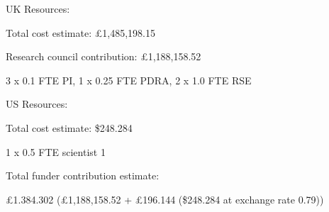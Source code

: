 
UK Resources:

Total cost estimate: £1,485,198.15

Research council contribution: £1,188,158.52

3 x 0.1 FTE PI, 1 x 0.25 FTE PDRA, 2 x 1.0 FTE RSE

\vspace{0.1in}
US Resources:

Total cost estimate: \$248.284

1 x 0.5 FTE scientist 1

\vspace{0.1in}
Total funder contribution estimate:

£1.384.302 (£1,188,158.52 + £196.144 (\$248.284 at exchange rate 0.79))

